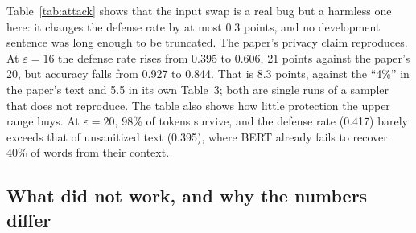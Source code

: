 \documentclass[11pt]{article}
\begin{document}
Table~\ref{tab:attack} shows that the input swap is a real bug but a harmless one here: it changes the defense rate by at most 0.3 points, and no development sentence was long enough to be truncated. The paper's privacy claim reproduces. At $\varepsilon = 16$ the defense rate rises from 0.395 to 0.606, 21 points against the paper's 20, but accuracy falls from 0.927 to 0.844. That is 8.3 points, against the ``4\%'' in the paper's text and 5.5 in its own Table~3; both are single runs of a sampler that does not reproduce. The table also shows how little protection the upper range buys. At $\varepsilon = 20$, 98\% of tokens survive, and the defense rate (0.417) barely exceeds that of unsanitized text (0.395), where BERT already fails to recover 40\% of words from their context.

\subsection{What did not work, and why the numbers differ}
\label{sec:findings}
\end{document}
